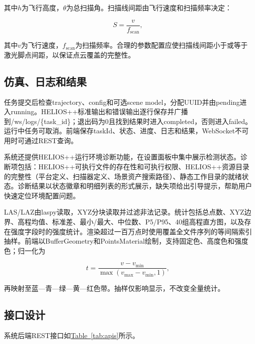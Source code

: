 \documentclass[a4paper,fleqn]{cas-sc}
\newcommand{\refTab}[1]{\hyperref[#1]{Table~\ref*{#1}}}
\begin{document}
其中$h$为飞行高度，$\theta$为总扫描角。扫描线间距由飞行速度和扫描频率决定：

\begin{equation}
    S = \frac{v}{f_{\text{scan}}},
\end{equation}

其中$v$为飞行速度，$f_{\text{scan}}$为扫描频率。合理的参数配置应使扫描线间距小于或等于激光脚点间距，以保证点云覆盖的完整性。

\subsection{仿真、日志和结果}

任务提交后检查trajectory、config和可选scene model，分配UUID并由pending进入running。HELIOS++标准输出和错误输出逐行保存并广播到/ws/logs/\{task\_id\}；退出码为0且找到结果时进入completed，否则进入failed。运行中任务可取消。前端保存taskId、状态、进度、日志和结果，WebSocket不可用时可通过REST查询。

系统还提供HELIOS++运行环境诊断功能，在设置面板中集中展示检测状态。诊断项包括：HELIOS++可执行文件的存在性和可执行权限、HELIOS++资源目录的完整性（平台定义、扫描器定义、场景资产搜索路径）、静态工作目录的就绪状态。诊断结果以状态徽章和明细列表的形式展示，缺失项给出引导提示，帮助用户快速定位环境配置问题。

LAS/LAZ由laspy读取\citep{laspy}，XYZ分块读取并过滤非法记录。统计包括总点数、XYZ边界、高程均值、标准差、最小/最大、中位数、P5/P95、40组高程直方图，以及存在强度字段时的强度统计。渲染超过一百万点时使用覆盖全文件序列的等间隔索引抽样。前端以BufferGeometry和PointsMaterial绘制，支持固定色、高度色和强度色；归一化为

\begin{equation}
    t = \frac{v - v_{\min}}{\max(v_{\max} - v_{\min}, 1)},
\end{equation}

再映射至蓝—青—绿—黄—红色带。抽样仅影响显示，不改变全量统计。

\subsection{接口设计}

系统后端REST接口如\refTab{tab:apis}所示。
\end{document}
